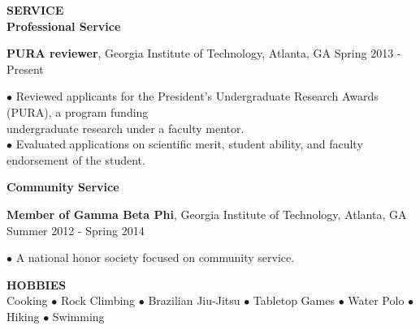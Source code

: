 \documentclass[10pt]{article}
\newenvironment{changemargin}[2]{%
  \list{}{\rightmargin#2\leftmargin#1
    \parsep=0pt\topsep=1pt\partopsep=0pt}
\item[]} {\endlist}
\newenvironment{indentmore}{\begin{changemargin}{10pt}{0cm}}{\end{changemargin}}
\begin{document}
\textbf{\large SERVICE}\\
{\bf Professional Service}
\begin{indentmore}
{\bf PURA reviewer}, Georgia Institute of Technology, Atlanta, GA \hfill Spring 2013 - Present
\begin{indentmore}
$\bullet$ Reviewed applicants for the President's Undergraduate Research Awards (PURA), a program funding \\ \hspace*{5pt} undergraduate research under a faculty mentor.\\
$\bullet$ Evaluated applications on scientific merit, student ability, and faculty endorsement of the student.\\
\end{indentmore}
\end{indentmore}


{\bf Community Service}
\begin{indentmore}
{\bf Member of Gamma Beta Phi}, Georgia Institute of Technology, Atlanta, GA \hfill Summer 2012 - Spring 2014
\begin{indentmore}
$\bullet$ A national honor society focused on community service. \\
\end{indentmore}
\end{indentmore}

\textbf{\large HOBBIES} \\
 Cooking $\bullet$ Rock Climbing $\bullet$ Brazilian Jiu-Jitsu $\bullet$  Tabletop Games $\bullet$ Water Polo $\bullet$ Hiking $\bullet$ Swimming
\end{document}
